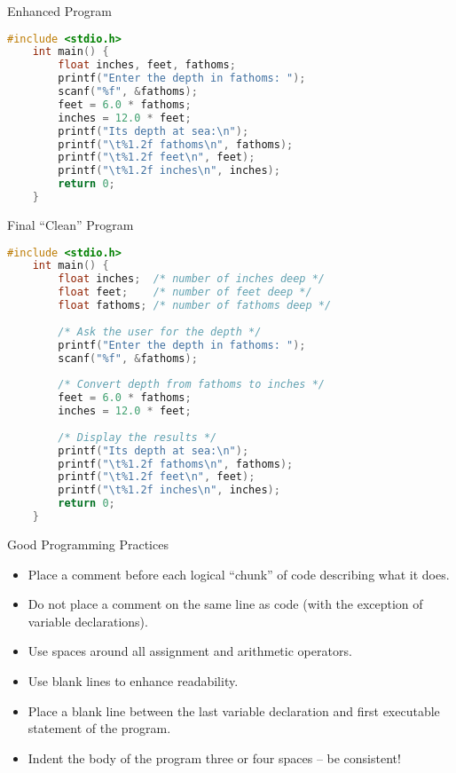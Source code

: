 \documentclass[graphics]{beamer}
\begin{document}
\begin{frame}[fragile]{Enhanced Program}
\begin{lstlisting}[language=C,basicstyle=\footnotesize,keywordstyle=\color{blue},commentstyle=\color{green},showstringspaces=false,stringstyle=\color{red}]
    #include <stdio.h>
    int main() {
        float inches, feet, fathoms;
        printf("Enter the depth in fathoms: ");
        scanf("%f", &fathoms);
        feet = 6.0 * fathoms;
        inches = 12.0 * feet;
        printf("Its depth at sea:\n");
        printf("\t%1.2f fathoms\n", fathoms);
        printf("\t%1.2f feet\n", feet);
        printf("\t%1.2f inches\n", inches);
        return 0;
    }
\end{lstlisting}
\end{frame}

\begin{frame}[fragile]{Final ``Clean'' Program}
\begin{lstlisting}[language=C,basicstyle=\footnotesize,keywordstyle=\color{blue},commentstyle=\color{green},showstringspaces=false,stringstyle=\color{red}]
    #include <stdio.h>
    int main() {
        float inches;  /* number of inches deep */
        float feet;    /* number of feet deep */
        float fathoms; /* number of fathoms deep */
        
        /* Ask the user for the depth */
        printf("Enter the depth in fathoms: ");
        scanf("%f", &fathoms);
        
        /* Convert depth from fathoms to inches */
        feet = 6.0 * fathoms;
        inches = 12.0 * feet;
        
        /* Display the results */
        printf("Its depth at sea:\n");
        printf("\t%1.2f fathoms\n", fathoms);
        printf("\t%1.2f feet\n", feet);
        printf("\t%1.2f inches\n", inches);
        return 0;
    }
\end{lstlisting}
\end{frame}

\begin{frame}{Good Programming Practices}
    \begin{itemize}
        \item Place a comment before each logical ``chunk'' of code describing what it does.
        \item Do not place a comment on the same line as code (with the exception of variable declarations).
        \item Use spaces around all assignment and arithmetic operators.
        \item Use blank lines to enhance readability.
        \item Place a blank line between the last variable declaration and first executable statement of the program.
        \item Indent the body of the program three or four spaces -- be consistent!
    \end{itemize}
\end{frame}
\end{document}
